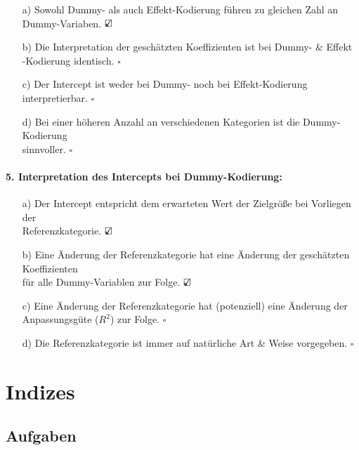 \documentclass[a4paper]{article}
\begin{document}
\begin{itemize}
    \item[a)] Sowohl Dummy- als auch Effekt-Kodierung führen zu gleichen Zahl an Dummy-Variaben. \hfill $\text{\rlap{$\checkmark$}}\square$
    \item[b)] Die Interpretation der geschätzten Koeffizienten ist bei Dummy- \& Effekt\\-Kodierung identisch. \hfill $\square$
    \item[c)] Der Intercept ist weder bei Dummy- noch bei Effekt-Kodierung interpretierbar. \hfill $\square$
    \item[d)] Bei einer höheren Anzahl an verschiedenen Kategorien ist die Dummy-Kodierung\\sinnvoller. \hfill $\square$
\end{itemize}

\paragraph{5. Interpretation des Intercepts bei Dummy-Kodierung:}

\begin{itemize}
    \item[a)] Der Intercept entspricht dem erwarteten Wert der Zielgröße bei Vorliegen der\\Referenzkategorie. \hfill $\text{\rlap{$\checkmark$}}\square$
    \item[b)] Eine Änderung der Referenzkategorie hat eine Änderung der geschätzten Koeffizienten\\für alle Dummy-Variablen zur Folge. \hfill $\text{\rlap{$\checkmark$}}\square$
    \item[c)] Eine Änderung der Referenzkategorie hat (potenziell) eine Änderung der\\Anpassungsgüte ($R^2$) zur Folge. \hfill $\square$
    \item[d)] Die Referenzkategorie ist immer auf natürliche Art \& Weise vorgegeben. \hfill $\square$
\end{itemize}


\clearpage


\section{Indizes}\label{chap:index}

\subsection{Aufgaben}
\end{document}
